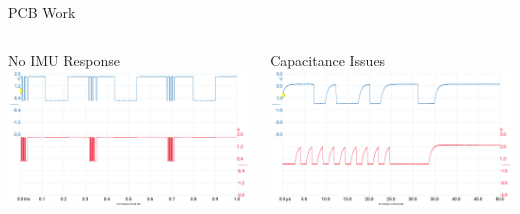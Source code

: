 \begin{frame}{PCB Work}
    \begin{columns}
        \begin{column}{0.5\textwidth}
            No IMU Response
            \includegraphics[height=1\textheight,width=1\textwidth,keepaspectratio]{images/IMU_SDA_SCL_NoData.png}
        \end{column}
        \begin{column}{0.5\textwidth}
            Capacitance Issues
            \includegraphics[height=1\textheight,width=1\textwidth,keepaspectratio]{images/PreResistorChange_Both.png}
        \end{column}
    \end{columns}
\end{frame}

